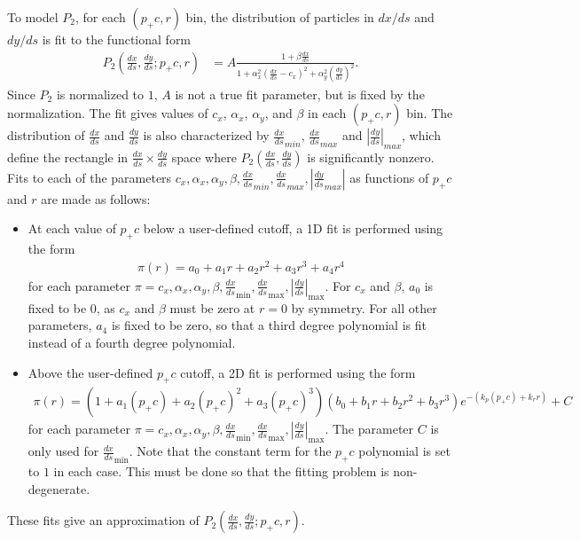 \documentclass[12pt]{article}
\newcommand{\dxds}{\frac{dx}{ds}}
\newcommand{\dyds}{\frac{dy}{ds}}
\newcommand{\dxdsmin}{\dxds_{\mathrm{min}}}
\newcommand{\dxdsmax}{\dxds_{\mathrm{max}}}
\newcommand{\dydsmax}{\left| \dyds \right|_{\mathrm{max}}}
\begin{document}
To model $P_2$, for each $(p_+ c, r)$ bin, the distribution of particles in $dx/ds$ and $dy/ds$ is
fit to the functional form
\begin{align}
P_2 \left( \dxds, \dyds; p_+ c, r \right) & = A \frac{1 + \beta \dxds}{1 + \alpha_x^2 \left( \dxds - c_x \right)^2 + \alpha_y^2 \left( \dyds \right)^2}. \label{eq:cauchy}
\end{align}
Since $P_2$ is normalized to $1$, $A$ is not a true fit parameter, but is fixed by the
normalization.  The fit gives values of $c_x$, $\alpha_x$, $\alpha_y$, and $\beta$ in each $(p_+ c,
r)$ bin.  The distribution of $\dxds$ and $\dyds$ is also characterized by $\dxds_{min}$,
$\dxds_{max}$ and $\left| \dyds \right|_{max}$, which define the rectangle in $\dxds \times \dyds$
space where $P_2 \left( \dxds, \dyds \right)$ is significantly nonzero.  Fits to each of the
parameters $c_x, \alpha_x, \alpha_y, \beta, \dxds_{min}, \dxds_{max}, \left| \dyds_{max} \right|$ as
functions of $p_+ c$ and $r$ are made as follows:
\begin{itemize}
\item
At each value of $p_+ c$ below a user-defined cutoff, a 1D fit is performed using the form
\begin{align}
\pi(r) = a_0 + a_1 r+ a_2 r^2 + a_3 r^3 + a_4 r^4 \label{eq:fit1}
\end{align}
for each parameter $\pi =c_x, \alpha_x, \alpha_y, \beta, \dxdsmin, \dxdsmax, \dydsmax$.  For $c_x$
and $\beta$, $a_0$ is fixed to be 0, as $c_x$ and $\beta$ must be zero at $r=0$ by symmetry.  For
all other parameters, $a_4$ is fixed to be zero, so that a third degree polynomial is fit instead of
a fourth degree polynomial.

\item
Above the user-defined $p_+ c$ cutoff, a 2D fit is performed using the form
\begin{align}
\pi(r) = (1 + a_1 (p_+c) + a_2 (p_+c)^2 + a_3 (p_+c)^3)
         (b_0 + b_1 r + b_2 r^2 + b_3 r^3) e^{-(k_p (p_+ c) + k_r r)} + C \label{eq:fit2}
\end{align}
for each parameter $\pi =c_x, \alpha_x, \alpha_y, \beta, \dxdsmin, \dxdsmax, \dydsmax$.  The
parameter $C$ is only used for $\dxdsmin$.  Note that the constant term for the $p_+ c$
polynomial is set to $1$ in each case.  This must be done so that the fitting problem is non-degenerate.

\end{itemize}
These fits give an approximation of $P_2 \left( \dxds, \dyds; p_+ c, r \right)$.
\end{document}
